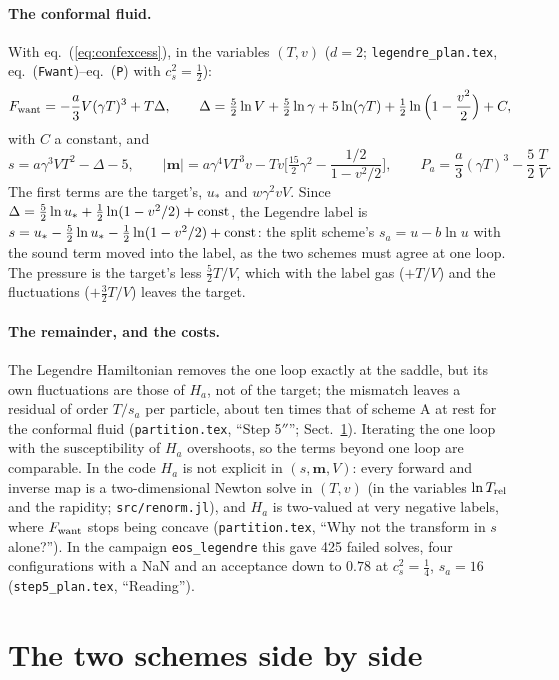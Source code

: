 \documentclass[11pt,aps,preprint,nofootinbib,superscriptaddress,tightenlines]{revtex4-2}
\def\st{\begin{equation}}
\def\stp{\end{equation}}
\def\Eq#1{eq.~(\ref{#1})}
\def\Sect#1{Sect.~\ref{#1}}
\let\oldparagraph\paragraph
\renewcommand{\paragraph}{\par\bigskip\oldparagraph}
\begin{document}
\paragraph{The conformal fluid.}  With \Eq{eq:confexcess}, in the variables $(T,v)$ ($d=2$; \nolinkurl{legendre_plan.tex}, eq.~(\texttt{Fwant})--eq.~(\texttt{P}) with $c_s^2=\tfrac12$):
\st
F_{\rm want}=-\frac a3V(\gamma T)^3+T\Delta,\qquad \Delta=\tfrac52\ln V+\tfrac52\ln\gamma+5\ln(\gamma T)+\tfrac12\ln\Big(1-\frac{v^2}2\Big)+C ,
\stp
with $C$ a constant, and
\st
s=a\gamma^3VT^2-\Delta-5,\qquad
|\bm m|=a\gamma^4VT^3v-Tv\Big[\tfrac{15}2\gamma^2-\frac{1/2}{1-v^2/2}\Big],\qquad
P_a=\frac a3(\gamma T)^3-\frac52\,\frac TV .
\label{eq:legconf}
\stp
The first terms are the target's, $u_*$ and $w\gamma^2vV$.  Since $\Delta=\tfrac52\ln u_*+\tfrac12\ln(1-v^2/2)+{\rm const}$, the Legendre label is
$s=u_*-\tfrac52\ln u_*-\tfrac12\ln(1-v^2/2)+{\rm const}$: the split scheme's $s_a=u-b\ln u$ with the sound term moved into the label, as the two
schemes must agree at one loop.  The pressure is the target's less $\tfrac52T/V$, which with the label gas ($+T/V$) and the fluctuations
($+\tfrac32T/V$) leaves the target.

\paragraph{The remainder, and the costs.}  The Legendre Hamiltonian removes the one loop exactly at the saddle, but its own fluctuations are those
of $H_a$, not of the target; the mismatch leaves a residual of order $T/s_a$ per particle, about ten times that of scheme A at rest for the
conformal fluid (\nolinkurl{partition.tex}, ``Step 5$''$''; \Sect{sec:compare}).  Iterating the one loop with the susceptibility of $H_a$ overshoots,
so the terms beyond one loop are comparable.  In the code $H_a$ is not explicit in $(s,\bm m,V)$: every forward and inverse map is a two-dimensional
Newton solve in $(T,v)$ (in the variables $\ln T_{\rm rel}$ and the rapidity; \nolinkurl{src/renorm.jl}), and $H_a$ is two-valued at very negative
labels, where $F_{\rm want}$ stops being concave (\nolinkurl{partition.tex}, ``Why not the transform in $s$ alone?'').  In the campaign
\texttt{eos\_legendre} this gave 425 failed solves, four configurations with a NaN and an acceptance down to $0.78$ at $c_s^2=\tfrac14$,
$s_a=16$ (\nolinkurl{step5_plan.tex}, ``Reading'').

\section{The two schemes side by side}
\label{sec:compare}
\end{document}
